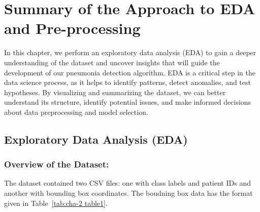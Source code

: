 \chapter{Summary of the Approach to EDA and Pre-processing}
\label{cha:chapter 2}

In this chapter, we perform an exploratory data analysis (EDA) to gain a deeper understanding of the dataset and uncover insights that will guide the development of our pneumonia detection algorithm. EDA is a critical step in the data science process, as it helps to identify patterns, detect anomalies, and test hypotheses. By visualizing and summarizing the dataset, we can better understand its structure, identify potential issues, and make informed decisions about data preprocessing and model selection.

\section{Exploratory Data Analysis (EDA)}
\label{sec:chap2 section 1}

\subsection{Overview of the Dataset:}
\label{subsec:chap2 section 1.1}

The dataset contained two CSV files: one with class labels and patient IDs and another with bounding box coordinates. The boudning box data has the format given in Table~\ref{tab:cha-2 table1}.

